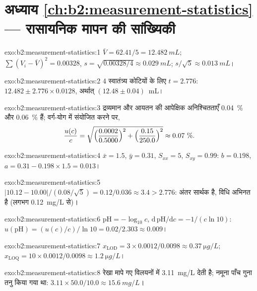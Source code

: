 \section*{अध्याय \ref{ch:b2:measurement-statistics} --- रासायनिक मापन की सांख्यिकी}

\begin{solution}{exo:b2:measurement-statistics:1}
$\bar V = 62.41/5 = \qty{12.482}{mL}$; $\sum(V_i - \bar V)^2 = 0.00328$, $s = \sqrt{0.00328/4} \approx
\qty{0.029}{mL}$; $s/\sqrt5 \approx \qty{0.013}{mL}$।
\end{solution}

\begin{solution}{exo:b2:measurement-statistics:2}
4 स्वातंत्र्य कोटियों के लिए $t = 2.776$: $12.482 \pm 2.776 \times 0.0128$, अर्थात् $(12.48 \pm 0.04)$~mL।
\end{solution}

\begin{solution}{exo:b2:measurement-statistics:3}
द्रव्यमान और आयतन की आपेक्षिक अनिश्चितताएँ 0.04~\% और 0.06~\% हैं; वर्ग-योग में
संयोजित करने पर,
\[\frac{u(c)}{c} = \sqrt{\Bigl(\frac{0.0002}{0.5000}\Bigr)^2 + \Bigl(\frac{0.15}{250.0}\Bigr)^2}
\approx 0.07~\%.\]
\end{solution}

\begin{solution}{exo:b2:measurement-statistics:4}
$\bar x = 1.5$, $\bar y = 0.31$, $S_{xx} = 5$, $S_{xy} = 0.99$: $b = 0.198$, $a = 0.31 - 0.198 \times 1.5
= 0.013$।
\end{solution}

\begin{solution}{exo:b2:measurement-statistics:5}
$|10.12 - 10.00|/(0.08/\sqrt5) = 0.12/0.036 \approx 3.4 > 2.776$: अंतर सार्थक है, विधि
अभिनत है (लगभग \qty{+0.12}{mg/L} से)।
\end{solution}

\begin{solution}{exo:b2:measurement-statistics:6}
$\mathrm{pH} = -\log_{10}c$, $\mathrm d\,\mathrm{pH}/\mathrm dc = -1/(c\ln10)$:
$u(\mathrm{pH}) = (u(c)/c)/\ln10 = 0.02/2.303 \approx 0.009$।
\end{solution}

\begin{solution}{exo:b2:measurement-statistics:7}
$x_{\mathrm{LOD}} = 3 \times 0.0012/0.0098 \approx \qty{0.37}{\micro g/L}$; $x_{\mathrm{LOQ}} = 10
\times 0.0012/0.0098 \approx \qty{1.2}{\micro g/L}$।
\end{solution}

\begin{solution}{exo:b2:measurement-statistics:8}
रेखा मापे गए विलयनों में \qty{3.11}{mg/L} देती है; नमूना पाँच गुना तनु किया गया था:
$3.11 \times 50.0/10.0 \approx \qty{15.6}{mg/L}$।
\end{solution}


